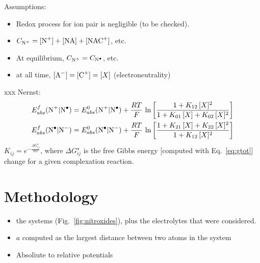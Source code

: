 \documentclass[review]{elsarticle}
\begin{document}
Assumptions:\begin{itemize}
	\item Redox process for ion pair is negligible (to be checked).
	\item $C_{\ce{N+}} = [\ce{N+}]+[\ce{NA}] + [\ce{NAC+}]$, etc.
	\item At equilibrium, $C_{\ce{N+}} = C_{\ce{N^.}}$, etc.
	\item at all time, $[\ce{A-}] = [\ce{C+}] = \ce[X]$ (electroneutrality)
\end{itemize}

xxx Nernst:\begin{align}
	E^f_{abs}(\ce{N+|N^.}) &= E^0_ {abs}(\ce{N+|N^.})+\frac{RT}{F}\,\ln\left[\frac{1+K_{12}\,[X]^2}{1+K_{01}\,[X]+K_{02}\,[X]^2}\right]\\
	E^f_{abs}(\ce{N^.|N-}) &= E^0_ {abs}(\ce{N^.|N-})+\frac{RT}{F}\,\ln\left[\frac{1+K_{21}\,[X]+K_{22}\,[X]^2}{1+K_{12}\,[X]^2}\right]
\end{align}
$K_{ij}= e^{-\frac{\Delta G_{ij}^\star}{RT}}$, where $\Delta G_{ij}^\star$ is the free Gibbs energy [computed with Eq.~\eqref{eq:gtot}] change for a given complexation reaction.

\section{Methodology}

\begin{itemize}
	\item the systems (Fig.~\ref{fig:nitroxides}), plus the electrolytes that were considered.
	\item $a$ computed as the largest distance between two atoms in the system
	\item Absoliute to relative potentials
\end{itemize}
\end{document}
